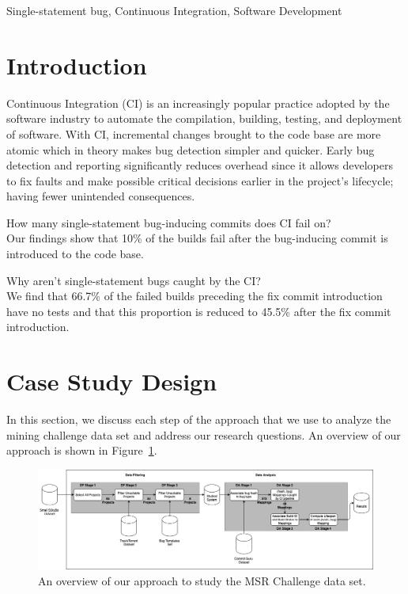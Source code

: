 \documentclass[10pt,conference]{IEEEtran}
\begin{document}
\begin{IEEEkeywords}
	Single-statement bug, Continuous Integration, Software Development
\end{IEEEkeywords}

\section{Introduction}
Continuous Integration (CI) is an increasingly popular practice adopted by the software industry to automate the compilation, building, testing, and deployment of software. With CI, incremental changes brought to the code base are more atomic which in theory makes bug detection simpler and quicker. Early bug detection and reporting significantly reduces overhead since it allows developers to fix faults and make possible critical decisions earlier in the project's lifecycle; having fewer unintended consequences.


\begin{questions}
    \item How many single-statement bug-inducing commits does CI fail on? \\ Our findings show that 10\% of the builds fail after the bug-inducing commit is introduced to the code base. 
\end{questions}
\begin{questions}[resume]
    \item Why aren't single-statement bugs caught by the CI? \\ We find that 66.7\% of the failed builds preceding the fix commit introduction have no tests and that this proportion is reduced to 45.5\% after the fix commit introduction. 
\end{questions}

\section{Case Study Design}
In this section, we discuss each step of the approach that we use to analyze the mining challenge data set and address our research questions. An overview of our approach is shown in Figure~\ref{fig:process}.

\begin{figure}[t]
\centering
\includegraphics[width=\linewidth]{process.png}
\caption{An overview of our approach to study the MSR Challenge data set.}
\label{fig:process}
\end{figure}
\end{document}
